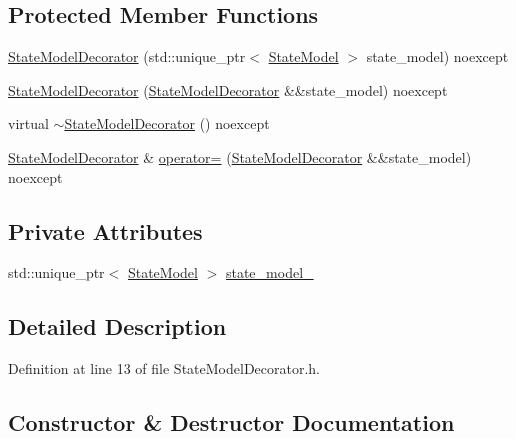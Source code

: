 \subsection*{Protected Member Functions}
\begin{DoxyCompactItemize}
\item 
\mbox{\hyperlink{classbfl_1_1StateModelDecorator_aeb562beb07afb133ca101245f7f16af8}{State\+Model\+Decorator}} (std\+::unique\+\_\+ptr$<$ \mbox{\hyperlink{classbfl_1_1StateModel}{State\+Model}} $>$ state\+\_\+model) noexcept
\item 
\mbox{\hyperlink{classbfl_1_1StateModelDecorator_a29a4fd2af9aa020b85cc73b672c87bfd}{State\+Model\+Decorator}} (\mbox{\hyperlink{classbfl_1_1StateModelDecorator}{State\+Model\+Decorator}} \&\&state\+\_\+model) noexcept
\item 
virtual \mbox{\hyperlink{classbfl_1_1StateModelDecorator_a5bcacbbecd5354161dee32eaaec8bfae}{$\sim$\+State\+Model\+Decorator}} () noexcept
\item 
\mbox{\hyperlink{classbfl_1_1StateModelDecorator}{State\+Model\+Decorator}} \& \mbox{\hyperlink{classbfl_1_1StateModelDecorator_a5f7ab9c56ebbf7f653014933d688339b}{operator=}} (\mbox{\hyperlink{classbfl_1_1StateModelDecorator}{State\+Model\+Decorator}} \&\&state\+\_\+model) noexcept
\end{DoxyCompactItemize}
\subsection*{Private Attributes}
\begin{DoxyCompactItemize}
\item 
std\+::unique\+\_\+ptr$<$ \mbox{\hyperlink{classbfl_1_1StateModel}{State\+Model}} $>$ \mbox{\hyperlink{classbfl_1_1StateModelDecorator_acd7df6c203047dfa16ef78dd34c1b769}{state\+\_\+model\+\_\+}}
\end{DoxyCompactItemize}


\subsection{Detailed Description}


Definition at line 13 of file State\+Model\+Decorator.\+h.



\subsection{Constructor \& Destructor Documentation}
\mbox{\label{classbfl_1_1StateModelDecorator_aeb562beb07afb133ca101245f7f16af8}} 
